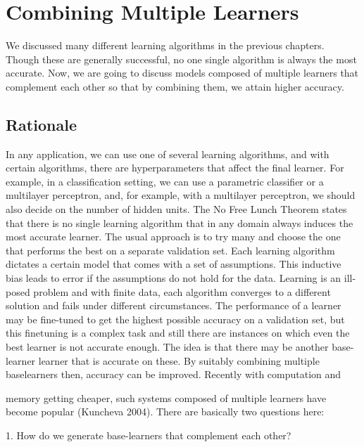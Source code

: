 \chapter{Combining Multiple Learners}
\label{chap:17-combining-multiple-learners}

We discussed many different learning algorithms in the previous chapters. Though these are generally successful, no one single algorithm is always the most accurate. Now, we are going to discuss models composed of multiple learners that complement each other so that by combining them, we attain higher accuracy.

\section{Rationale}

In any application, we can use one of several learning algorithms, and with certain algorithms, there are hyperparameters that affect the final learner. For example, in a classification setting, we can use a parametric classifier or a multilayer perceptron, and, for example, with a multilayer perceptron, we should also decide on the number of hidden units. The No Free Lunch Theorem states that there is no single learning algorithm that in any domain always induces the most accurate learner. The usual approach is to try many and choose the one that performs the best on a separate validation set. Each learning algorithm dictates a certain model that comes with a set of assumptions. This inductive bias leads to error if the assumptions do not hold for the data. Learning is an ill-posed problem and with finite data, each algorithm converges to a different solution and fails under different circumstances. The performance of a learner may be fine-tuned to get the highest possible accuracy on a validation set, but this finetuning is a complex task and still there are instances on which even the best learner is not accurate enough. The idea is that there may be another base-learner learner that is accurate on these. By suitably combining multiple baselearners then, accuracy can be improved. Recently with computation and

memory getting cheaper, such systems composed of multiple learners have become popular (Kuncheva 2004). There are basically two questions here:

1. How do we generate base-learners that complement each other?

